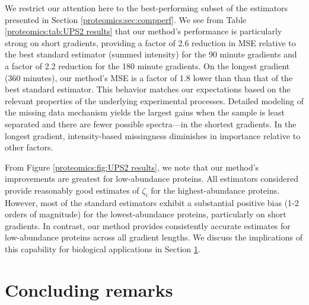 %
We restrict our attention here to the best-performing subset of the estimators presented in Section \ref{proteomics:sec:compperf}.
We see from Table \ref{proteomics:tab:UPS2 results} that our method's performance is particularly strong on short gradients, providing a factor of 2.6 reduction in MSE relative to the best standard estimator (summed intensity) for the 90 minute gradients and a factor of 2.2 reduction for the 180 minute gradients.
On the longest gradient (360 minutes), our method's MSE is a factor of 1.8 lower than than that of the best standard estimator.
This behavior matches our expectations based on the relevant properties of the underlying experimental processes.
Detailed modeling of the missing data mechanism yields the largest gains when the sample is least separated and there are fewer possible spectra---in the shortest gradients.
In the longest gradient, intensity-based missingness diminishes in importance relative to other factors.

From Figure \ref{proteomics:fig:UPS2 results}, we note that our method's improvements are greatest for low-abundance proteins.
All estimators considered provide reasonably good estimates of $\zeta_i$ for the highest-abundance proteins.
However, most of the standard estimators exhibit a substantial positive bias (1-2 orders of magnitude) for the lowest-abundance proteins, particularly on short gradients.
In contrast, our method provides consistently accurate estimates for low-abundance proteins across all gradient lengths.
We discuss the implications of this capability for biological applications in Section \ref{proteomics:sec:remarks}.




\section{Concluding remarks}
\label{proteomics:sec:remarks}

